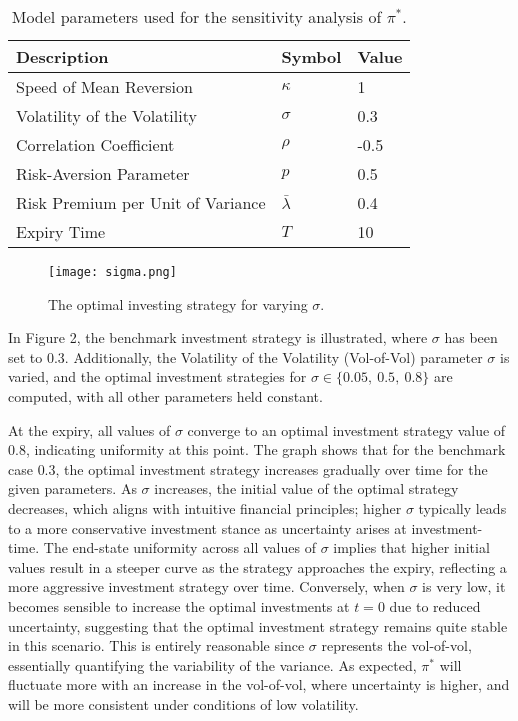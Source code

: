 \documentclass[11pt]{article}
\numberwithin{equation}{section}
\begin{document}
\begin{table}[!h]
    \centering
    \begin{tabular}{lll}
    \toprule
    \textbf{Description} & \textbf{Symbol} & \textbf{Value} \\
    \midrule
    Speed of Mean Reversion & $\kappa$ & 1 \\
    Volatility of the Volatility & $\sigma$ & 0.3 \\
    Correlation Coefficient & $\rho$ & -0.5 \\
    Risk-Aversion Parameter & $p$ & 0.5  \\
    Risk Premium per Unit of Variance & $\bar{\lambda}$ & 0.4 \\
    Expiry Time & $T$ & 10 \\
    \bottomrule
    \end{tabular}
    \caption{Model parameters used for the sensitivity analysis of $\pi^*$.}
    \label{table:table10}
\end{table}
\newpage
\begin{figure}[!h]
    \centering
    \hspace*{-2cm}
    \texttt{[image: sigma.png]}
    \label{Figure 2}
    \setlength{\abovecaptionskip}{-5pt}
    \caption{The optimal investing strategy for varying $\sigma$.}
\end{figure}

In Figure 2, the benchmark investment strategy is illustrated, where $\sigma$
has been set to $0.3$. Additionally, the Volatility of the Volatility
(Vol-of-Vol) parameter $\sigma$ is
varied, and the optimal investment strategies for $\sigma \in \{0.05,\: 0.5,\: 0.8\}$
are computed, with all other parameters held constant.

At the expiry, all values of $\sigma$ converge to an optimal investment strategy value of
$0.8$, indicating uniformity at this point. The graph shows that for the
benchmark case $0.3$, the optimal investment strategy increases gradually over time
for the given parameters. As $\sigma$ increases, the initial value of the
optimal strategy decreases, which aligns with intuitive financial principles;
higher $\sigma$ typically leads to a more conservative investment stance as
uncertainty arises at investment-time. The
end-state uniformity across all values of $\sigma$ implies that higher initial
values result in a steeper curve as the strategy approaches the expiry,
reflecting a more aggressive investment strategy over time. Conversely, when
$\sigma$ is very low, it becomes sensible to increase the optimal investments at
$t=0$ due to reduced
uncertainty, suggesting that the optimal investment strategy remains quite
stable in this scenario. This is entirely reasonable since $\sigma$ represents
the vol-of-vol, essentially quantifying the variability of
the variance. As expected, $\pi^*$ will fluctuate more with an increase in the
vol-of-vol, where uncertainty is higher, and will be more
consistent under conditions of low volatility. 
\end{document}
